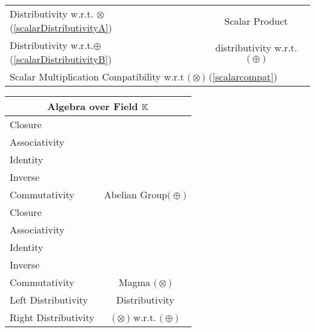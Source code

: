 \documentclass[a4paper,12pt]{scrartcl}    %
\newcommand{\OpA}{\otimes}
\newcommand{\OpB}{\oplus}
\begin{document}
\begin{landscape}
\begin{minipage}[t][]{0.60 \linewidth}
\begin{minipage}[c]{0,5\textwidth}
\begin{tabular}{|l|c|}
			   \hline 
			    \cellcolor{blue!25} \footnotesize Distributivity w.r.t. $\OpA$ (\ref{scalarDistributivityA})&  \tiny\cellcolor{yellow!25}Scalar Product\\
			    \cellcolor{blue!25} \footnotesize Distributivity w.r.t.$\OpB$ (\ref{scalarDistributivityB}) & \tiny\cellcolor{yellow!25} distributivity w.r.t. $\big(\OpB\big)$  \\
			   \hline
			    \multicolumn{2}{l}{\footnotesize \cellcolor{blue!25} Scalar Multiplication Compatibility w.r.t  $\big(\OpA\big)$ (\ref{scalarcompat})}\\
			   \hline
			\end{tabular}
			\vfill
		\end{minipage}
		\hspace{1cm}
		\begin{minipage}[c]{0,5\textwidth}	
			\begin{tabular}{|l|c|} %
			  \hline
			  \multicolumn{2}{c}{\cellcolor{green!25}Algebra over Field $\mathbb{K}$} \\
			  \hline
			    \cellcolor{blue!25} \footnotesize Closure& \cellcolor{yellow!25}  \\
			    \cellcolor{blue!25} \footnotesize Associativity& \cellcolor{yellow!25}  \\
			    \cellcolor{blue!25} \footnotesize Identity& \cellcolor{yellow!25} \\
			    \cellcolor{blue!25} \footnotesize Inverse& \cellcolor{yellow!25} \\
			    \cellcolor{blue!25} \footnotesize Commutativity& \multirow{-5}{*}{\tiny\cellcolor{yellow!25}Abelian Group$\big(\OpB\big)$} \\
			   \hline
			    \cellcolor{blue!25} \footnotesize Closure& \cellcolor{yellow!25}  \\
			    \cellcolor{red!25} \footnotesize Associativity& \cellcolor{yellow!25}  \\
			    \cellcolor{red!25} \footnotesize Identity& \cellcolor{yellow!25} \\
			    \cellcolor{red!25} \footnotesize Inverse& \cellcolor{yellow!25} \\
			    \cellcolor{red!25} \footnotesize Commutativity& \multirow{-5}{*}{\tiny\cellcolor{yellow!25} Magma $\big(\OpA\big)$} \\
			  \hline
			  	\cellcolor{blue!25} \footnotesize Left Distributivity&  \tiny\cellcolor{yellow!25}Distributivity\\
			    \cellcolor{blue!25} \footnotesize Right Distributivity & \tiny\cellcolor{yellow!25} $\big(\OpA\big)$ w.r.t. $\big(\OpB\big)$  \\

\end{tabular}
\end{minipage}
\end{minipage}
\end{landscape}
\end{document}
